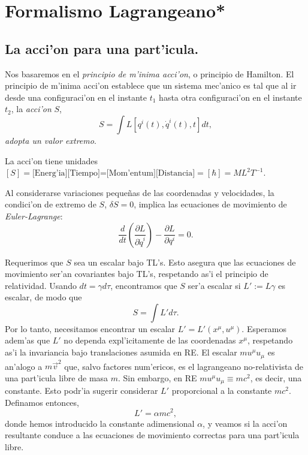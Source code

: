 \section{Formalismo Lagrangeano*}
\subsection{La acci'on para una part'icula.}
Nos basaremos en el \emph{principio de m'inima acci'on}, o
principio de Hamilton. El principio de m'inima acci'on
establece que un sistema mec'anico es tal que al ir desde una
configuraci'on en el instante $t_1$ hasta otra configuraci'on en el instante
$t_2$, la \textit{acci'on} $S$,
\begin{equation}
S=\int L\left[  q^i(t),\dot{q}^i(t)  ,t\right]  dt, \label{Sdt}
\end{equation}
\textit{adopta un valor extremo}.

La acci'on tiene unidades $\left[  S\right]  = \text{[Energ'ia][Tiempo]=[Mom'entum][Distancia]}=[\hbar]=ML^2T^{-1}$.

Al considerarse variaciones peque\~nas de las coordenadas y
velocidades, la condici'on de extremo de $S$, $\delta S=0$, implica las
ecuaciones de movimiento de \textit{Euler-Lagrange}:
\begin{equation}
\frac{d}{dt}\left(  \frac{\partial L}{\partial\dot{q}^i}\right)
-\frac{\partial L}{\partial q^i}=0.\label{L-euler}
\end{equation}

Requerimos que $S$ sea un escalar bajo TL's. Esto asegura que las ecuaciones de
movimiento ser'an covariantes bajo TL's, respetando as'i el principio de
relatividad. Usando $dt=\gamma d\tau$, encontramos que $S$ ser'a escalar si
$L':=L\gamma$ es escalar, de modo que
\begin{equation}
S=\int L' d\tau.
\end{equation}
Por lo tanto, necesitamos encontrar un escalar $L'=L'(x^\mu,u^\mu)$. Esperamos
adem'as que $L'$ no dependa expl'icitamente de las coordenadas $x^\mu$,
respetando as'i la invariancia bajo translaciones asumida en RE. El escalar $m u^\mu u_\mu$  es an'alogo a $m\vec{v}^2$  que, salvo factores
num'ericos, es el lagrangeano no-relativista de una part'icula libre de masa $m$. Sin embargo, en RE $m u^\mu u_\mu\equiv mc^2$, es decir, una constante. Esto podr'ia sugerir considerar $L'$ proporcional a la constante $mc^2$. Definamos entonces,
\begin{equation}
L'=\alpha mc^2,
\end{equation}
donde hemos introducido la constante adimensional $\alpha$, y veamos si la acci'on resultante conduce a las ecuaciones de movimiento correctas para una part'icula libre.

